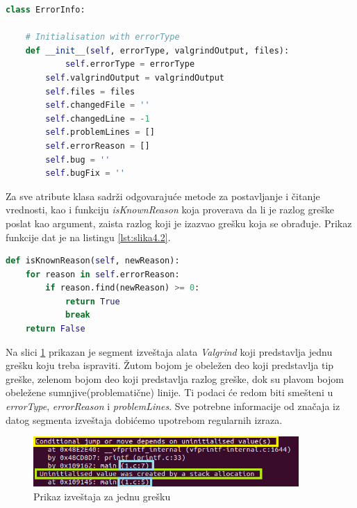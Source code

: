 \documentclass[12pt,oneside]{memoir}
\theoremstyle{plain}
\theoremstyle{definition}
\begin{document}
\begin{lstlisting}[style=mystyle,caption={Potpis klase \textit{ErrorInfo}}, label={lst:slika4.1},language={Python}] 
class ErrorInfo:

	# Initialisation with errorType
	def __init__(self, errorType, valgrindOutput, files):
        	self.errorType = errorType
		self.valgrindOutput = valgrindOutput
		self.files = files
		self.changedFile = ''
		self.changedLine = -1
		self.problemLines = []
		self.errorReason = []
		self.bug = ''
		self.bugFix = ''
\end{lstlisting}

Za sve atribute klasa sadrži odgovarajuće metode za postavljanje i čitanje vrednosti, kao i funkciju  \textit{isKnownReason} koja proverava da li je razlog greške poslat kao argument, zaista razlog koji je izazvao grešku koja se obrađuje. Prikaz funkcije dat je na listingu \ref{lst:slika4.2}.

\begin{lstlisting}[style=mystyle,caption={Prikaz funkcije koja proverava validnost razloga greške}, label={lst:slika4.2},language={Python}] 
def isKnownReason(self, newReason):
	for reason in self.errorReason:
		if reason.find(newReason) >= 0:
			return True
			break
	return False
\end{lstlisting}


Na slici \ref{fig:slika4.3} prikazan je segment izveštaja alata \textit{Valgrind} koji predstavlja jednu grešku koju treba ispraviti. Žutom bojom je obeležen deo koji predstavlja tip greške, zelenom bojom deo koji predstavlja razlog greške, dok su plavom bojom obeležene sumnjive(problematične) linije. Ti podaci će redom biti smešteni u \textit{errorType}, \textit{errorReason} i \textit{problemLines}. Sve potrebne informacije od značaja iz datog segmenta izveštaja dobićemo upotrebom regularnih izraza.

\begin{figure}[!ht]
  \centering
  \includegraphics[width=0.9\textwidth]{ErrorClassExplaination.png}
  \caption{Prikaz izveštaja za jednu grešku}
  \label{fig:slika4.3}
\end{figure}
\end{document}
